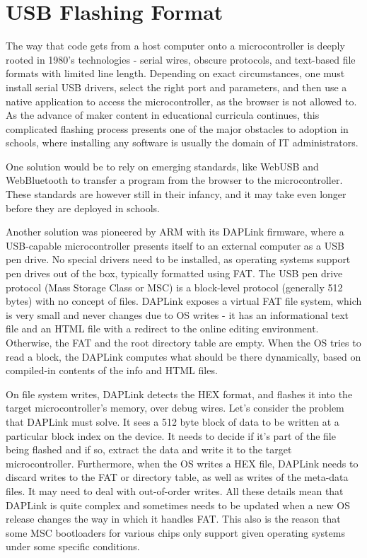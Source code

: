 \section{USB Flashing Format}
\label{sec:uf2}

The way that code gets from a host computer onto a microcontroller is deeply rooted in 1980's technologies - 
serial wires, obscure protocols, and text-based file formats with limited line length. Depending on exact circumstances,
one must install serial USB drivers, select the right port and parameters, and then use a native application to access
the microcontroller, as the browser is not allowed to. As the advance of maker content in educational curricula continues,
this complicated flashing process presents one of the major obstacles to adoption in schools, where installing any software
is usually the domain of IT administrators.

One solution would be to rely on emerging standards, like WebUSB and WebBluetooth to transfer a program from the browser 
to the microcontroller. These standards are however still in their infancy, and it may take even longer before they are 
deployed in schools.

Another solution was pioneered by ARM with its DAPLink firmware, where a USB-capable microcontroller presents itself 
to an external computer as a USB pen drive. No special drivers need to be installed, as operating systems support pen
drives out of the box, typically formatted using FAT. The USB pen drive protocol (Mass Storage Class or MSC) is a
block-level protocol (generally 512 bytes) with no concept of files. DAPLink exposes a virtual FAT file system, which
is very small and never changes due to OS writes - it has an informational text file and an HTML file with a redirect
to the online editing environment. Otherwise, the FAT and the root directory table are empty. When the OS tries to
read a block, the DAPLink computes what should be there dynamically, based on compiled-in contents of the info and HTML files.

On file system writes, DAPLink detects the HEX format, and flashes it into the target microcontroller's memory,
over debug wires. Let's consider the problem that DAPLink must solve. It sees a 512 byte block of data to be written
at a particular block index on the device. It needs to decide if it's part of the file being flashed and if so, extract
the data and write it to the target microcontroller. Furthermore, when the OS writes a HEX file, DAPLink needs to discard
writes to the FAT or directory table, as well as writes of the meta-data files. It may need to deal with out-of-order writes.
All these details mean that DAPLink is quite complex and sometimes needs to be updated when a new OS release changes the way
in which it handles FAT. This also is the reason that some MSC bootloaders for various chips only support given operating
systems under some specific conditions.

